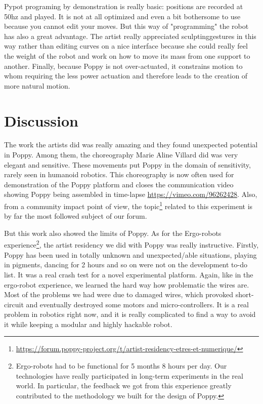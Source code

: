 Pypot programing by demonstration is really basic: positions are recorded at 50hz and played. It is not at all optimized and even a bit bothersome to use because you cannot edit your moves. But this way of "programming" the robot has also a great advantage. The artist really appreciated sculptinggestures in this way rather than editing curves on a nice interface because she could really feel the weight of the robot and work on how to move its mass from one support to another. Finally, because Poppy is not over-actuated, it constrains motion to whom requiring the less power actuation and therefore leads to the creation of more natural motion.


\section{Discussion} %

The work the artists did was really amazing and they found unexpected potential in Poppy. Among them, the choreography Marie Aline Villard did was very elegant and sensitive. These movements put Poppy in the domain of sensitivity, rarely seen in humanoid robotics. This choreography is now often used for demonstration of the Poppy platform and closes the communication video showing Poppy being assembled in time-lapse \url{https://vimeo.com/96262428}.
Also, from a community impact point of view, the topic\footnote{\url{https://forum.poppy-project.org/t/artist-residency-etres-et-numerique/}} related to this experiment is by far the most followed subject of our forum.

But this work also showed the limits of Poppy. As for the Ergo-robots experience\footnote{Ergo-robots had to be functional for 5 months 8 hours per day. Our technologies have really participated in long-term experiments in the real world. In particular, the feedback we got from this experience greatly contributed to the methodology we built for the design of Poppy.}, the artist residency we did with  Poppy was really instructive. Firstly, Poppy has been used in totally unknown and unexpected/able situations, playing in pigments, dancing for 2 hours and so on were not on the development to-do list.
It was a real crash test for a novel experimental platform. Again, like in the ergo-robot experience, we learned the hard way how problematic the wires are. Most of the problems we had were due to damaged wires, which provoked short-circuit and eventually destroyed some motors and micro-controllers. It is a real problem in robotics right now, and it is really complicated to find a way to avoid it while keeping a modular and highly hackable robot.

